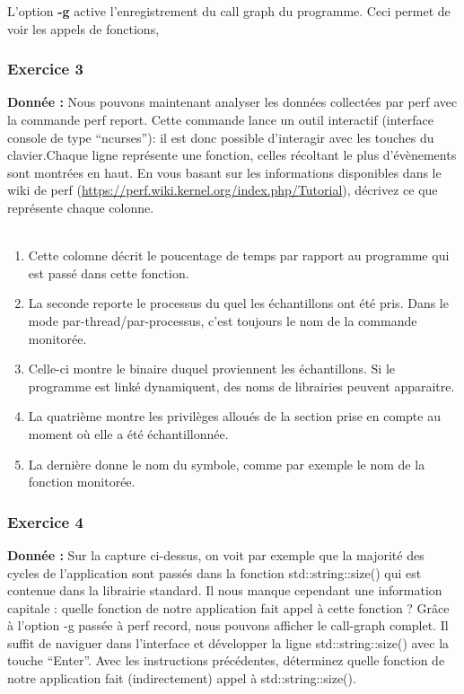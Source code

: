 L'option \textbf{-g} active l'enregistrement du call graph du programme. Ceci permet de voir les appels de fonctions, 

\subsubsection{Exercice 3}
\textbf{Donnée : } Nous	pouvons	maintenant	analyser	les	données	collectées	par	perf	avec	la	commande	perf	report.	
Cette	commande	lance	un	outil	interactif	(interface	console de	type	“ncurses”):	il	est	donc	possible	
d'interagir avec	les	touches	du	clavier.Chaque	ligne	représente	une	fonction,	celles	récoltant	le	plus	d'évènements	sont	montrées	en	haut.	
En	vous	basant sur	les	informations	disponibles	dans	le	wiki	de	perf	
(\url{https://perf.wiki.kernel.org/index.php/Tutorial}),	décrivez	ce	que	représente	chaque	colonne.\\\\

\begin{enumerate}
\item Cette colomne décrit le poucentage de temps par rapport au programme qui est passé dans cette fonction.
\item La seconde reporte le processus du quel les échantillons ont été pris. Dans le mode par-thread/par-processus, c'est toujours le nom de la commande monitorée. 
\item Celle-ci montre le binaire duquel proviennent les échantillons. Si le programme est linké dynamiquent, des noms de librairies peuvent apparaitre.  
\item La quatrième montre les privilèges alloués de la section prise en compte au moment où elle a été échantillonnée.
\item La dernière donne le nom du symbole, comme par exemple le nom de la fonction monitorée.
\end{enumerate}

\subsubsection{Exercice 4}
\textbf{Donnée : } Sur	la	capture	ci-dessus,	on	voit	par	exemple	que	la	majorité	des	cycles	de	l'application	sont	passés	
dans	la	fonction	std::string::size() qui	est	contenue	dans	la	librairie	standard.	Il	nous	manque	
cependant	une	information	capitale :	quelle	fonction	de	notre	application	fait	appel	à	cette	fonction	?	
Grâce	à	l'option	-g passée	à	perf	record,	nous	pouvons	afficher	le	call-graph	complet.	Il	suffit	de	
naviguer	dans	l'interface	et	développer	la	ligne	std::string::size() avec	la	touche	“Enter”.	
Avec	les	instructions	précédentes,	déterminez quelle	fonction	de	notre	application	fait	(indirectement)	
appel	à	std::string::size().\\\\


